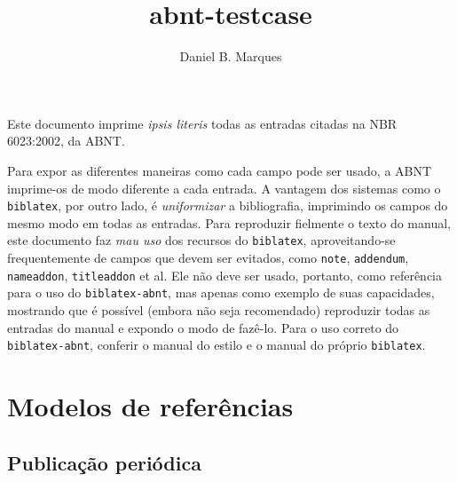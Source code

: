 \documentclass[a4paper]{article}
\title{abnt-testcase}
\author{Daniel B. Marques}
\begin{document}
\maketitle

Este documento imprime \textit{ipsis literis} todas as entradas citadas na NBR
6023:2002, da ABNT.

Para expor as diferentes maneiras como cada campo pode ser usado, a ABNT
imprime-os de modo diferente a cada entrada. A vantagem dos sistemas como
o \texttt{biblatex}, por outro lado, é \emph{uniformizar} a bibliografia,
imprimindo os campos do mesmo modo em todas as entradas. Para reproduzir
fielmente o texto do manual, este documento faz \emph{mau uso} dos recursos do
\texttt{biblatex}, aproveitando-se frequentemente de campos que devem ser
evitados, como \texttt{note}, \texttt{addendum}, \texttt{nameaddon},
\texttt{titleaddon} et al. Ele não deve ser usado, portanto, como referência
para o uso do \texttt{biblatex-abnt}, mas apenas como exemplo de suas
capacidades, mostrando que é possível (embora não seja recomendado) reproduzir
todas as entradas do manual e expondo o modo de fazê-lo. Para o uso correto do
\texttt{biblatex-abnt}, conferir o manual do estilo e o manual do próprio
\texttt{biblatex}.

\tableofcontents

\nocite{*}

\clearpage


\setcounter{section}{6}


\section{Modelos de referências}


	\printbibliography[keyword=7.1, title={Monografia no todo}]

	\printbibliography[keyword=7.2,
    title={Monografia no todo em meio eletrônico}]

	\printbibliography[keyword=7.3, title={Parte de monografia}]

	\printbibliography[keyword=7.4,
    title={Parte de monografia em meio eletrônico}]

	\subsection{Publicação periódica}

	  \printbibliography[heading=subbib, keyword=7.5.1,
      title={Publicação periódica como um todo}]
	  \printbibliography[heading=subbib, keyword=7.5.2,
      title={Partes de revista, boletim etc.}]
	  \printbibliography[heading=subbib, keyword=7.5.3,
      title={Artigo e/ou matéria de revista, boletim etc.}]
	  \printbibliography[heading=subbib, keyword=7.5.4,
      title={Artigo e/ou matéria de revista,
             boletim etc.\ em meio eletrônico}]
	  \printbibliography[heading=subbib, keyword=7.5.5,
      title={Artigo e/ou matéria de jornal}]
\end{document}
